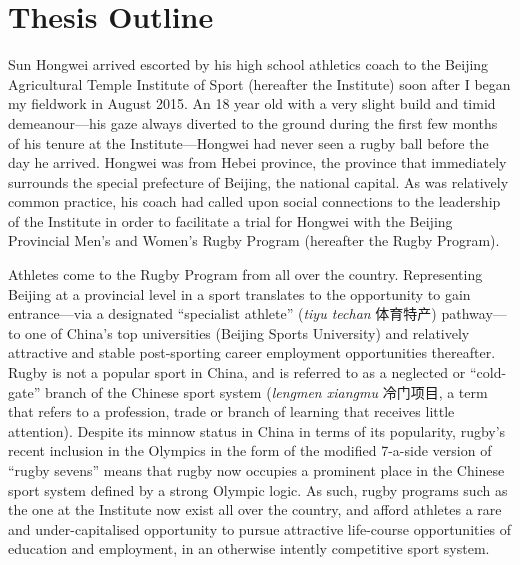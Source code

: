 \chapter{\label{introduction}Thesis Outline}

Sun Hongwei arrived escorted by his high school athletics coach to the Beijing Agricultural Temple Institute of Sport (hereafter the Institute) soon after I began my fieldwork in August 2015.  An 18 year old with a very slight build and timid demeanour---his gaze always diverted to the ground during the first few months of his tenure at the Institute---Hongwei had never seen a rugby ball before the day he arrived.
Hongwei was from Hebei province, the province that immediately surrounds the special prefecture of Beijing, the national capital.  As was relatively common practice, his coach had called upon social connections to the leadership of the Institute in order to facilitate a trial for Hongwei with the Beijing Provincial Men’s and Women's Rugby Program (hereafter the Rugby Program).

Athletes come to the Rugby Program from all over the country.  Representing Beijing at a provincial level in a sport translates to the opportunity to gain entrance---via a designated ``specialist athlete'' (\textit{tiyu techan} 体育特产) pathway---to one of China's top universities (Beijing Sports University) and relatively attractive and stable post-sporting career employment opportunities thereafter.  Rugby is not a popular sport in China, and is referred to as a neglected or ``cold-gate'' branch of the Chinese sport system (\textit{lengmen xiangmu} 冷门项目, a term that refers to a profession, trade or branch of learning that receives little attention). Despite its minnow status in China in terms of its popularity, rugby's recent inclusion in the Olympics in the form of the modified 7-a-side version of ``rugby sevens'' means that rugby now occupies a prominent place in the Chinese sport system defined by a strong Olympic logic. As such, rugby programs such as the one at the Institute now exist all over the country, and afford athletes a rare and under-capitalised opportunity to pursue attractive life-course opportunities of education and employment, in an otherwise intently competitive sport system.

